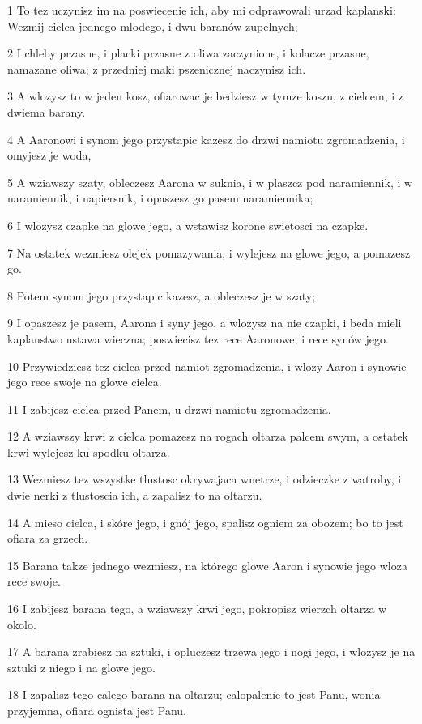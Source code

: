 \par 1 To tez uczynisz im na poswiecenie ich, aby mi odprawowali urzad kaplanski: Wezmij cielca jednego mlodego, i dwu baranów zupelnych;
\par 2 I chleby przasne, i placki przasne z oliwa zaczynione, i kolacze przasne, namazane oliwa; z przedniej maki pszenicznej naczynisz ich.
\par 3 A wlozysz to w jeden kosz, ofiarowac je bedziesz w tymze koszu, z cielcem, i z dwiema barany.
\par 4 A Aaronowi i synom jego przystapic kazesz do drzwi namiotu zgromadzenia, i omyjesz je woda,
\par 5 A wziawszy szaty, obleczesz Aarona w suknia, i w plaszcz pod naramiennik, i w naramiennik, i napiersnik, i opaszesz go pasem naramiennika;
\par 6 I wlozysz czapke na glowe jego, a wstawisz korone swietosci na czapke.
\par 7 Na ostatek wezmiesz olejek pomazywania, i wylejesz na glowe jego, a pomazesz go.
\par 8 Potem synom jego przystapic kazesz, a obleczesz je w szaty;
\par 9 I opaszesz je pasem, Aarona i syny jego, a wlozysz na nie czapki, i beda mieli kaplanstwo ustawa wieczna; poswiecisz tez rece Aaronowe, i rece synów jego.
\par 10 Przywiedziesz tez cielca przed namiot zgromadzenia, i wlozy Aaron i synowie jego rece swoje na glowe cielca.
\par 11 I zabijesz cielca przed Panem, u drzwi namiotu zgromadzenia.
\par 12 A wziawszy krwi z cielca pomazesz na rogach oltarza palcem swym, a ostatek krwi wylejesz ku spodku oltarza.
\par 13 Wezmiesz tez wszystke tlustosc okrywajaca wnetrze, i odzieczke z watroby, i dwie nerki z tlustoscia ich, a zapalisz to na oltarzu.
\par 14 A mieso cielca, i skóre jego, i gnój jego, spalisz ogniem za obozem; bo to jest ofiara za grzech.
\par 15 Barana takze jednego wezmiesz, na którego glowe Aaron i synowie jego wloza rece swoje.
\par 16 I zabijesz barana tego, a wziawszy krwi jego, pokropisz wierzch oltarza w okolo.
\par 17 A barana zrabiesz na sztuki, i opluczesz trzewa jego i nogi jego, i wlozysz je na sztuki z niego i na glowe jego.
\par 18 I zapalisz tego calego barana na oltarzu; calopalenie to jest Panu, wonia przyjemna, ofiara ognista jest Panu.
